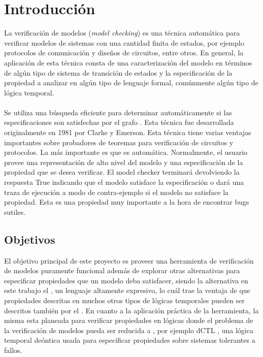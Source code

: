 \chapter{Introducción}
\noindent La verificación de modelos (\emph{model checking}) es una técnica automática para verificar modelos de sistemas con una cantidad finita de estados, por ejemplo protocolos de comunicación y diseños de circuitos, entre otros. En general, la aplicación de esta técnica consta de una caracterización del modelo en términos de algún tipo de sistema de transición de estados y la especificación de la propiedad a analizar en algún tipo de lenguaje formal, comúnmente algún tipo de lógica temporal.\\
\\
\noindent Se utiliza una búsqueda eficiente para determinar automáticamente si las especificaciones son satisfechas por el grafo \cite{Clarke:5}. Esta técnica fue desarrollada originalmente en 1981 por Clarke y Emerson. Esta técnica tiene varias ventajas importantes sobre probadores de teoremas para verificación de circuitos y protocolos. La más importante es que es automática. Normalmente, el usuario provee una representación de alto nivel del modelo y una especificación de la propiedad que se desea verificar. El model checker terminará devolviendo la respuesta True indicando que el modelo satisface la especificación o dará una traza de ejecución a modo de contra-ejemplo si el modelo no satisface la propiedad. Esta es una propiedad muy importante a la hora de encontrar bugs sutiles.

\section{Objetivos}
El objetivo principal de este proyecto es proveer una herramienta de verificación de modelos puramente funcional además de explorar otras alternativas para especificar propiedades que un modelo deba satisfacer, siendo la alternativa en este trabajo el {\mucalculo}, un lenguaje altamente expresivo, lo cuál trae la ventaja de que propiedades descritas en muchos otros tipos de lógicas temporales pueden ser descritos también por el {\mucalculo}. En cuanto a la aplicación práctica de la herramienta, la misma esta planeada para verificar propiedades en lógicas donde el problema de la verificación de modelos pueda ser reducida a {\mucalculo}, por ejemplo dCTL \cite{Castro:9}, una lógica temporal deóntica usada para especificar propiedades sobre sistemas tolerantes a fallos.

